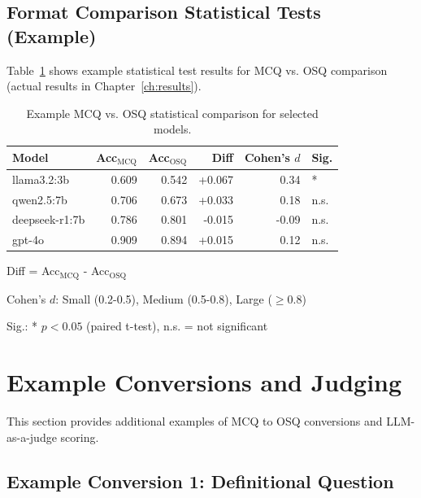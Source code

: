\subsection{Format Comparison Statistical Tests (Example)}

Table~\ref{tab:format_comparison_stats_example} shows example statistical test results for MCQ vs. OSQ comparison (actual results in Chapter~\ref{ch:results}).

\begin{table}[H]
    \centering
    \caption{Example MCQ vs. OSQ statistical comparison for selected models.}
    \label{tab:format_comparison_stats_example}
    \small
    \begin{tabular}{lrrrrl}
        \toprule
        \textbf{Model} & \textbf{Acc$_{\text{MCQ}}$} & \textbf{Acc$_{\text{OSQ}}$} & \textbf{Diff} & \textbf{Cohen's $d$} & \textbf{Sig.} \\
        \midrule
        llama3.2:3b & 0.609 & 0.542 & +0.067 & 0.34 & * \\
        qwen2.5:7b & 0.706 & 0.673 & +0.033 & 0.18 & n.s. \\
        deepseek-r1:7b & 0.786 & 0.801 & -0.015 & -0.09 & n.s. \\
        gpt-4o & 0.909 & 0.894 & +0.015 & 0.12 & n.s. \\
        \bottomrule
    \end{tabular}
    \begin{tablenotes}
        \small
        \item Diff = Acc$_{\text{MCQ}}$ - Acc$_{\text{OSQ}}$
        \item Cohen's $d$: Small (0.2-0.5), Medium (0.5-0.8), Large ($\geq 0.8$)
        \item Sig.: * $p < 0.05$ (paired t-test), n.s. = not significant
    \end{tablenotes}
\end{table}

\section{Example Conversions and Judging}\label{app:examples}

This section provides additional examples of MCQ to OSQ conversions and LLM-as-a-judge scoring.

\subsection{Example Conversion 1: Definitional Question}

